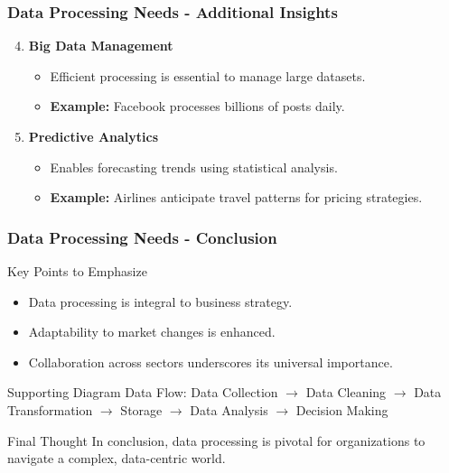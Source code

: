 \documentclass[aspectratio=169]{beamer}
\begin{document}
\begin{frame}[fragile]
    \frametitle{Data Processing Needs - Additional Insights}
    \begin{enumerate}
        \setcounter{enumi}{3} %
        \item \textbf{Big Data Management}
        \begin{itemize}
            \item Efficient processing is essential to manage large datasets.
            \item \textbf{Example:} Facebook processes billions of posts daily.
        \end{itemize}
        
        \item \textbf{Predictive Analytics}
        \begin{itemize}
            \item Enables forecasting trends using statistical analysis.
            \item \textbf{Example:} Airlines anticipate travel patterns for pricing strategies.
        \end{itemize}
    \end{enumerate}
\end{frame}

\begin{frame}[fragile]
    \frametitle{Data Processing Needs - Conclusion}
    \begin{block}{Key Points to Emphasize}
        \begin{itemize}
            \item Data processing is integral to business strategy.
            \item Adaptability to market changes is enhanced.
            \item Collaboration across sectors underscores its universal importance.
        \end{itemize}
    \end{block}
    
    \begin{block}{Supporting Diagram}
        Data Flow: Data Collection $\rightarrow$ Data Cleaning $\rightarrow$ Data Transformation $\rightarrow$ Storage $\rightarrow$ Data Analysis $\rightarrow$ Decision Making
    \end{block}
    
    \begin{block}{Final Thought}
        In conclusion, data processing is pivotal for organizations to navigate a complex, data-centric world.
    \end{block}
\end{frame}
\end{document}
